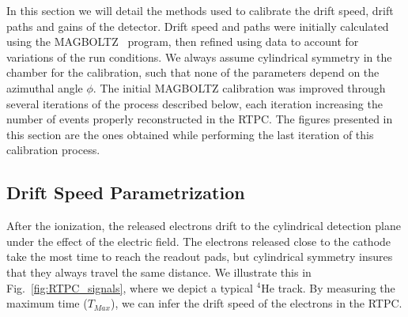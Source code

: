 \documentclass[preprint,5p]{elsarticle}
\begin{document}
In this section we will detail the methods used to calibrate the drift speed,
drift paths and gains of the detector. Drift speed and paths were initially
calculated using the MAGBOLTZ~\cite{MAGBOLTZ} program, then refined using
data to account for variations of the run conditions. We always assume 
cylindrical symmetry in the chamber for the calibration, such that none of
the parameters depend on the azimuthal angle $\phi$. The initial MAGBOLTZ
calibration was improved through several iterations of the
process described below, each iteration increasing the number of events 
properly reconstructed in the RTPC. The figures presented in this section
are the ones obtained while performing the last iteration of this
calibration process.

\subsection{Drift Speed Parametrization}

After the ionization, the released electrons 
drift to the cylindrical detection plane under the effect of the electric field. The 
electrons released close to the cathode take the most time to reach the readout 
pads, but cylindrical symmetry insures that they always travel the same 
distance. We illustrate this in Fig.~\ref{fig:RTPC_signals}, where we depict a 
typical $^{4}$He track. By measuring the maximum time ($T_{Max}$), we can infer the drift 
speed of the electrons in the RTPC.\\
\end{document}
